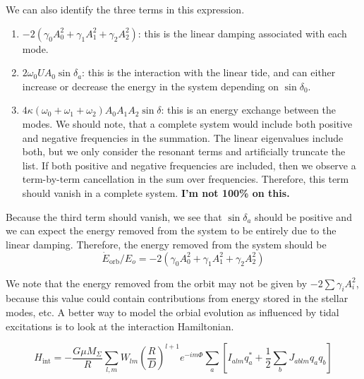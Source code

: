 We can also identify the three terms in this expression.
\begin{enumerate}
\item{$-2\left(\gamma_0 A_0^2 + \gamma_1 A_1^2 + \gamma_2 A_2^2\right)$: this is the linear damping associated with each mode.}
\item{$2\omega_0 U A_0 \sin\delta_a$: this is the interaction with the linear tide, and can either increase or decrease the energy in the system depending on $\sin\delta_0$.}
\item{$4\kappa\left(\omega_0 + \omega_1 + \omega_2\right) A_0 A_1 A_2\sin\delta$: this is an energy exchange between the modes. We should note, that a complete system would include both positive and negative frequencies in the summation. The linear eigenvalues include both, but we only consider the resonant terms and artificially truncate the list. If both positive and negative frequencies are included, then we observe a term-by-term cancellation in the sum over frequencies. Therefore, this term should vanish in a complete system. \textbf{I'm not 100\% on this.}}
\end{enumerate}
Because the third term should vanish, we see that $\sin\delta_a$ should be positive and we can expect the energy removed from the system to be entirely due to the linear damping. Therefore, the energy removed from the system should be
\begin{equation}\label{damping only}
\dot{E}_{\mathrm{orb}}/E_o = -2\left(\gamma_0 A_0^2 + \gamma_1 A_1^2 + \gamma_2 A_2^2\right)
\end{equation}

We note that the energy removed from the orbit may not be given by $-2\sum\gamma_i A_i^2$, because this value could contain contributions from energy stored in the stellar modes, etc. A better way to model the orbial evolution as influenced by tidal excitations is to look at the interaction Hamiltonian.

\begin{equation} \label{Hint}
H_{\mathrm{int}} = - \frac{G \mu M_{\Sigma}}{R} \sum_{l,m} W_{lm} \left(\frac{R}{D}\right)^{l+1} e^{-i m \Phi} \sum_{a} \left[ I_{alm} q_a^\ast + \frac{1}{2}\sum_{b} J_{ablm} q_a q_b \right]
\end{equation}

